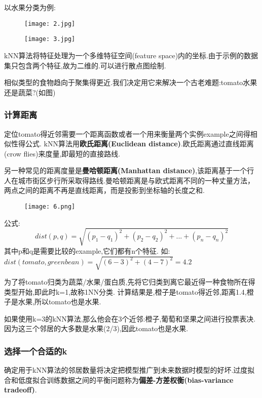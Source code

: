 \documentclass[11pt,a4paper,oneside]{book}
\begin{document}
以水果分类为例:
\begin{figure}[H]
	\centering
	\texttt{[image: 2.jpg]}  
\end{figure}
\begin{figure}[H]
	\centering
	\texttt{[image: 3.jpg]}  
\end{figure}
kNN算法将特征处理为一个多维特征空间(feature space)内的坐标.由于示例的数据集只包含两个特征,故为二维的.可以进行散点图绘制.

相似类型的食物趋向于聚集得更近.我们决定用它来解决一个古老难题:tomato水果还是蔬菜?(如图)

\subsubsection{计算距离}
定位tomato得近邻需要一个距离函数或者一个用来衡量两个实例example之间得相似性得公式. kNN算法用\textbf{欧氏距离(Euclidean distance)}.欧氏距离通过直线距离(crow flies)来度量,即最短的直接路线.
\begin{tcolorbox}[colback=pink!10!white,colframe=pink!100!black]
另一种常见的距离度量是\textbf{曼哈顿距离(Manhattan distance)},该距离基于一个行人在城市街区步行所采取得路线.曼哈顿距离是与欧式距离不同的一种丈量方法，两点之间的距离不再是直线距离，而是投影到坐标轴的长度之和.
\begin{figure}[H]
	\centering
	\texttt{[image: 6.png]}  
\end{figure}

\end{tcolorbox}
公式: 
\begin{equation}
dist(p,q)=\sqrt{(p_1-q_1)^2+(p_2-q_2)^2+...+(p_n-q_n)^2}
\end{equation}
其中p和q是需要比较的example,它们都有n个特征.
如:$dist(tomato,green bean)=\sqrt{(6-3)^2+(4-7)^2}=4.2$

为了将tomato归类为蔬菜/水果/蛋白质,先将它归类到离它最近得一种食物所在得类型开始,即此时k=1,故称1NN分类. 计算结果是,橙子是tomato得近邻,距离1.4,橙子是水果,所以tomato也是水果.

如果使用k=3的kNN算法,那么他会在3个近邻:橙子,葡萄和坚果之间进行投票表决.因为这三个邻居的大多数是水果(2/3),因此tomato也是水果.

\subsubsection{选择一个合适的k}
确定用于kNN算法的邻居数量将决定把模型推广到未来数据时模型的好坏.过度拟合和低度拟合训练数据之间的平衡问题称为\textbf{偏差-方差权衡(bias-variance tradeoff)}.
\end{document}
